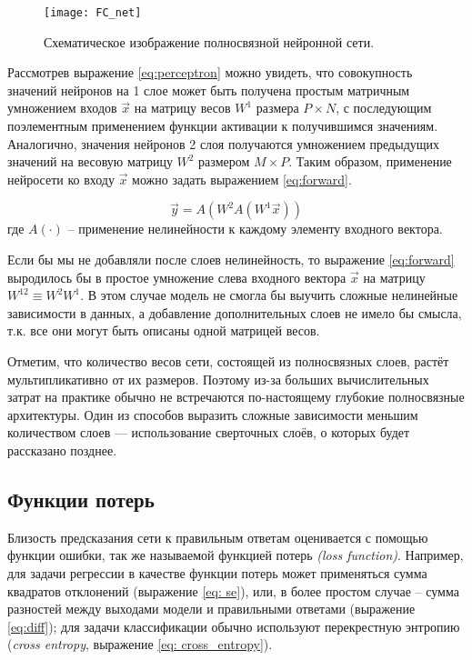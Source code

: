 \begin{figure}[h!]
    \begin{center}
   	    \texttt{[image: FC\_net]}
   	\end{center}
   	\caption{Схематическое изображение полносвязной нейронной сети.}
   	\label{tikzpicture: fc_net}
\end{figure}

Рассмотрев выражение \ref{eq:perceptron} можно увидеть, что 
совокупность значений нейронов на 1 слое может быть получена 
простым матричным умножением входов $\vec{x}$ на матрицу весов
 $W^1$ размера $P \times N$, с последующим поэлементным применением 
функции активации к получившимся значениям. Аналогично, значения нейронов
2 слоя получаются умножением предыдущих значений на весовую матрицу
$W^2$ размером $M \times P$. Таким образом, применение нейросети
ко входу $\vec{x}$ можно задать выражением \ref{eq:forward}.

\begin{equation}\label{eq:forward}
	   \vec{y} = A(W^{2} A(W^{1} \vec{x}))
\end{equation}
где $A(\cdot)$ -- применение нелинейности к каждому элементу входного 
вектора.

\indent
\indent
Если бы мы не добавляли после слоев нелинейность, то выражение \ref{eq:forward}
выродилось бы в простое умножение слева входного вектора $\vec{x}$ на матрицу
$W^{12} \equiv W^{2} W^{1}$. В этом случае модель не смогла бы выучить 
сложные нелинейные зависимости в данных, а добавление дополнительных слоев
не имело бы смысла, т.к. все они могут быть описаны одной матрицей весов.

\indent
\indent
Отметим, что количество весов сети, состоящей из полносвязных слоев, растёт
мультипликативно от их размеров. Поэтому из-за больших вычислительных затрат
 на практике обычно не встречаются по-настоящему глубокие полносвязные архитектуры.
 Один из способов выразить сложные зависимости меньшим количеством слоев ---
 использование сверточных слоёв, о которых будет рассказано позднее.


\subsection{Функции потерь}
\label{section: losses}

\indent
\indent
Близость предсказания сети к правильным ответам оценивается
с помощью функции ошибки, так же называемой 
 функцией потерь \textit{(loss function)}. 
Например, для задачи регрессии в качестве функции потерь
может применяться сумма квадратов отклонений
 (выражение \ref{eq: se}),
 или, в более простом случае -- сумма разностей между выходами модели
  и правильными ответами (выражение \ref{eq:diff});
для задачи классификации обычно используют перекрестную энтропию 
(\textit{cross entropy}, выражение \ref{eq: cross_entropy}).


